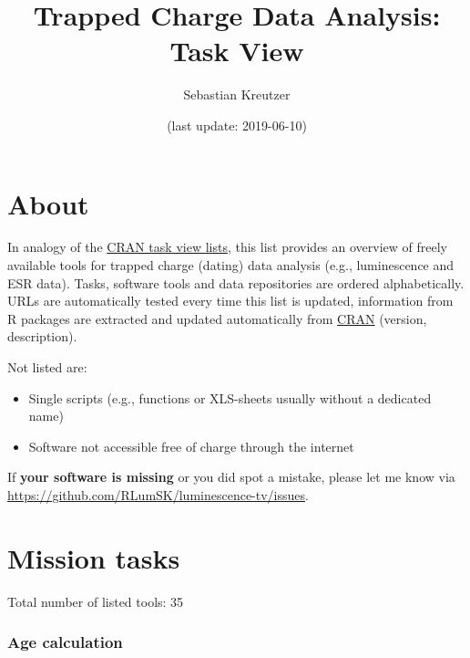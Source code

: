 \documentclass[]{article}
\title{Trapped Charge Data Analysis: Task View}
\author{Sebastian Kreutzer}
\date{(last update: 2019-06-10)}
\providecommand{\tightlist}{%
  \setlength{\itemsep}{0pt}\setlength{\parskip}{0pt}}
\begin{document}
\maketitle

\hypertarget{about}{%
\section{About}\label{about}}

In analogy of the \href{https://cran.rstudio.com/web/views/}{CRAN task view lists},
this list provides an overview of freely available tools for trapped charge (dating) data analysis (e.g., luminescence and ESR data). Tasks, software tools and data repositories are ordered alphabetically. URLs are automatically tested every time this list is updated, information from R packages are extracted and updated automatically from \href{https://cloud.r-project.org}{CRAN} (version, description).

Not listed are:

\begin{itemize}
\tightlist
\item
  Single scripts (e.g., functions or XLS-sheets usually without a dedicated name)
\item
  Software not accessible free of charge through the internet
\end{itemize}

If \textbf{your software is missing} or you did spot a mistake, please let me know via \url{https://github.com/RLumSK/luminescence-tv/issues}.

\hypertarget{mission-tasks}{%
\section{Mission tasks}\label{mission-tasks}}

Total number of listed tools: 35

\hypertarget{age-calculation}{%
\subsubsection{Age calculation}\label{age-calculation}}
\end{document}
